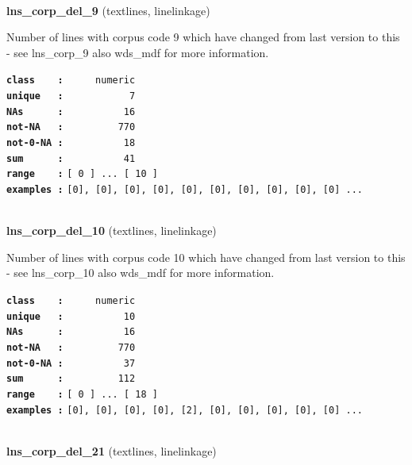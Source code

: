 \documentclass[]{article}
\begin{document}
~

\textbf{lns\_corp\_del\_9} (textlines, linelinkage)

Number of lines with corpus code 9 which have changed from last version
to this - see lns\_corp\_9 also wds\_mdf for more information.

\textbf{\texttt{class\ \ \ \ :}} \texttt{~~~~~numeric}\\
\textbf{\texttt{unique\ \ \ :}} \texttt{~~~~~~~~~~~7}\\
\textbf{\texttt{NAs\ \ \ \ \ \ :}} \texttt{~~~~~~~~~~16}\\
\textbf{\texttt{not-NA\ \ \ :}} \texttt{~~~~~~~~~770}\\
\textbf{\texttt{not-0-NA\ :}} \texttt{~~~~~~~~~~18}\\
\textbf{\texttt{sum\ \ \ \ \ \ :}} \texttt{~~~~~~~~~~41}\\
\textbf{\texttt{range\ \ \ \ :}}
\texttt{{[}\ 0\ {]}\ ...\ {[}\ 10\ {]}}\\
\textbf{\texttt{examples\ :}}
\texttt{{[}0{]},\ {[}0{]},\ {[}0{]},\ {[}0{]},\ {[}0{]},\ {[}0{]},\ {[}0{]},\ {[}0{]},\ {[}0{]},\ {[}0{]}\ ...}\\

~

\textbf{lns\_corp\_del\_10} (textlines, linelinkage)

Number of lines with corpus code 10 which have changed from last version
to this - see lns\_corp\_10 also wds\_mdf for more information.

\textbf{\texttt{class\ \ \ \ :}} \texttt{~~~~~numeric}\\
\textbf{\texttt{unique\ \ \ :}} \texttt{~~~~~~~~~~10}\\
\textbf{\texttt{NAs\ \ \ \ \ \ :}} \texttt{~~~~~~~~~~16}\\
\textbf{\texttt{not-NA\ \ \ :}} \texttt{~~~~~~~~~770}\\
\textbf{\texttt{not-0-NA\ :}} \texttt{~~~~~~~~~~37}\\
\textbf{\texttt{sum\ \ \ \ \ \ :}} \texttt{~~~~~~~~~112}\\
\textbf{\texttt{range\ \ \ \ :}}
\texttt{{[}\ 0\ {]}\ ...\ {[}\ 18\ {]}}\\
\textbf{\texttt{examples\ :}}
\texttt{{[}0{]},\ {[}0{]},\ {[}0{]},\ {[}0{]},\ {[}2{]},\ {[}0{]},\ {[}0{]},\ {[}0{]},\ {[}0{]},\ {[}0{]}\ ...}\\

~

\textbf{lns\_corp\_del\_21} (textlines, linelinkage)
\end{document}
